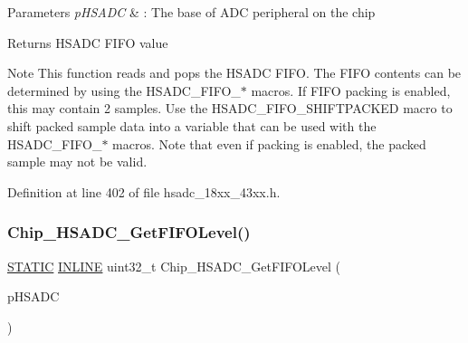 \begin{DoxyParams}{Parameters}
{\em p\+H\+S\+A\+DC} & \+: The base of A\+DC peripheral on the chip \\
\hline
\end{DoxyParams}
\begin{DoxyReturn}{Returns}
H\+S\+A\+DC F\+I\+FO value 
\end{DoxyReturn}
\begin{DoxyNote}{Note}
This function reads and pops the H\+S\+A\+DC F\+I\+FO. The F\+I\+FO contents can be determined by using the H\+S\+A\+D\+C\+\_\+\+F\+I\+F\+O\+\_\+$\ast$ macros. If F\+I\+FO packing is enabled, this may contain 2 samples. Use the H\+S\+A\+D\+C\+\_\+\+F\+I\+F\+O\+\_\+\+S\+H\+I\+F\+T\+P\+A\+C\+K\+ED macro to shift packed sample data into a variable that can be used with the H\+S\+A\+D\+C\+\_\+\+F\+I\+F\+O\+\_\+$\ast$ macros. Note that even if packing is enabled, the packed sample may not be valid. 
\end{DoxyNote}


Definition at line 402 of file hsadc\+\_\+18xx\+\_\+43xx.\+h.

\mbox{\label{group___h_s_a_d_c__18_x_x__43_x_x_ga217f6d1396eb48c4a17232b837fda910}} 
\subsubsection{\texorpdfstring{Chip\+\_\+\+H\+S\+A\+D\+C\+\_\+\+Get\+F\+I\+F\+O\+Level()}{Chip\_HSADC\_GetFIFOLevel()}}
{\footnotesize\ttfamily \hyperlink{group___l_p_c___types___public___macros_ga10b2d890d871e1489bb02b7e70d9bdfb}{S\+T\+A\+T\+IC} \hyperlink{spifi__18xx__43xx_8h_a2eb6f9e0395b47b8d5e3eeae4fe0c116}{I\+N\+L\+I\+NE} uint32\+\_\+t Chip\+\_\+\+H\+S\+A\+D\+C\+\_\+\+Get\+F\+I\+F\+O\+Level (\begin{DoxyParamCaption}\item[{\hyperlink{struct_l_p_c___h_s_a_d_c___t}{L\+P\+C\+\_\+\+H\+S\+A\+D\+C\+\_\+T} $\ast$}]{p\+H\+S\+A\+DC }\end{DoxyParamCaption})}



